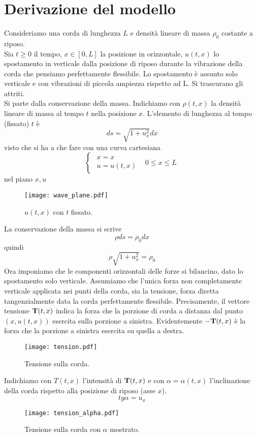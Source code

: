 \section{Derivazione del modello}
Consideriamo una corda di lunghezza $L$ e densit\`a lineare di massa $\rho_0$
costante a riposo.\\
Sia $t≥ 0$ il tempo, $x \in [0,L]$ la posizione in orizzontale, 
$u(t,x)$ lo spostamento in verticale dalla posizione di riposo durante la
vibrazione della corda che pensiamo perfettamente flessibile.
Lo spostamento \`e assunto solo verticale e con vibrazioni di piccola ampiezza
rispetto ad L. Si trascurano gli attriti.\\
Si parte dalla conservazione della massa. Indichiamo con $\rho (t,x)$ la densit\`a
lineare di massa al tempo $t$ nella posizione $x$. L'elemento di lunghezza al
tempo (fissato) $t$ \`e
\[
	ds=\sqrt{1+u_x^2} dx
\]
visto che si ha a che fare con una curva cartesiana
\[
	\left\{ 
	\begin{array}{ll}
		\begin{array}{l}
			x=x \\
			u=u(t,x)
		\end{array}
	& 0 ≤ x ≤ L
	\end{array}
	\right.
\]
nel piano $x,u$
\begin{figure}[H]
	\centering
	\texttt{[image: wave\_plane.pdf]}
	\caption{$u(t,x)$ con $t$ fissato.}
	\label{wave_plane}
\end{figure}
La conservazione della massa si scrive
\[
	\rho ds= \rho_0 dx
\]
quindi
\[
	\rho \sqrt{1 + u_x^2}= \rho_0
\]
Ora imponiamo che le componenti orizzontali delle forze si bilancino, dato lo
spostamento solo verticale.
Assumiamo che l'unica forza non completamente verticale  applicata nei punti 
della corda, sia la tensione, forza diretta tangenzialmente data la corda perfettamente
flessibile.
Precisamente, il vettore tensione ${\bf T}(t,x)$ indica la forza che la porzione
di corda a distanza dal punto $(x, u(t,x))$ esercita sulla porzione a sinistra.
Evidentemente ${\bf -T}(t,x)$ \`e la forza che la porzione a sinistra esercita su
quella a destra.
\begin{figure}[H]
	\centering
	\texttt{[image: tension.pdf]}
	\caption{Tensione sulla corda.}
	\label{tension}
\end{figure}
Indichiamo con $T(t,x)$ l'intensit\`a di ${\bf T}(t,x)$ e con $\alpha= \alpha (t,x)$
l'inclinazione della corda rispetto alla posizione di riposo (asse $x$).
\[
	tg \alpha = u_x
\]
\begin{figure}[H]
	\centering
	\texttt{[image: tension\_alpha.pdf]}
	\caption{Tensione sulla corda con $\alpha$ mostrato.}
	\label{tension_alpha}
\end{figure}
